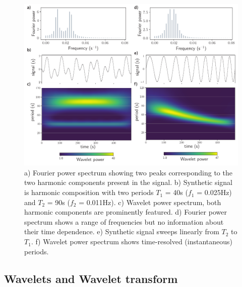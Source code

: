 \begin{figure}[h!]
\centering
\includegraphics[width=\linewidth]{figures/Figure1}
\caption{a) Fourier power spectrum showing two peaks corresponding to the two harmonic components present in the signal.  b) Synthetic  signal is harmonic composition with two periods $T_1$ = 40s ($f_1$ = 0.025Hz) and $T_2$ = 90s ($f_2$ = 0.011Hz). c) Wavelet power spectrum, both harmonic components are prominently featured. d) Fourier power spectrum shows a range of frequencies but no information about their time dependence. e) Synthetic signal sweeps linearly from $T_2$ to $T_1$. f) Wavelet power spectrum shows time-resolved (instantaneous) periods. }
\label{fig1}
\end{figure}

\subsection*{Wavelets and Wavelet transform}


